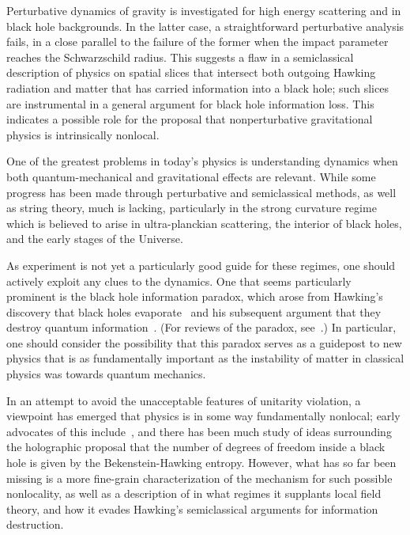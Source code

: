 Perturbative dynamics of gravity is investigated for high energy scattering and in black hole backgrounds.  In the latter case, a straightforward perturbative analysis fails, in a close parallel to the failure of the former when the impact parameter reaches the Schwarzschild radius.  This suggests a flaw in a semiclassical description of physics on spatial slices that intersect both outgoing Hawking radiation and matter that has carried information into a black hole; such slices are instrumental in a general argument for black hole information loss.  This indicates a possible role for the proposal that nonperturbative gravitational physics is intrinsically nonlocal.

\Date{}


One of the greatest problems in today's physics is understanding dynamics when both quantum-mechanical and gravitational effects are relevant.  While some progress has been made through perturbative and semiclassical methods, as well as string theory, much is lacking, particularly in the strong curvature regime which is believed to arise in ultra-planckian scattering, the interior of black holes, and the early stages of the Universe.   

As experiment is not yet a particularly good guide for these regimes, one should actively exploit any clues to the dynamics.  One that seems particularly prominent is the black hole information paradox, which arose from Hawking's discovery that black holes evaporate~ and his subsequent argument that they destroy quantum information~.  (For reviews of the paradox, see~.)  In particular, one should consider the possibility that this paradox serves as a guidepost to new physics that is as fundamentally important as  the instability of matter in classical physics was towards quantum mechanics.  

In an attempt to avoid the unacceptable features of unitarity violation, a viewpoint has emerged that physics is in some way fundamentally nonlocal; early advocates of this include~, and there has been much study of ideas surrounding the holographic proposal that the number of degrees of freedom inside a black hole is given by the Bekenstein-Hawking entropy.  However, what has so far been missing is a more fine-grain characterization of the mechanism for such possible nonlocality, as well as a description of in what regimes it supplants  local field theory, and how  it evades Hawking's semiclassical arguments for information destruction.  

